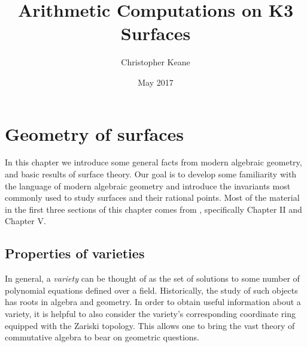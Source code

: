 \documentclass[12pt,twoside]{reedthesis}
\title{Arithmetic Computations on K3 Surfaces}
\author{Christopher Keane}
\date{May 2017}
\theoremstyle{plain}
\theoremstyle{definition}
\theoremstyle{remark}
\begin{document}
\tableofcontents
\mainmatter 
\pagestyle{fancyplain} 

\chapter{Geometry of surfaces}
In this chapter we introduce some general facts from modern algebraic geometry, and basic results of surface theory. Our goal is to develop some familiarity with the language of modern algebraic geometry and introduce the invariants most commonly used to study surfaces and their rational points. Most of the material in the first three sections of this chapter comes from \cite{hartshorne}, specifically Chapter II and Chapter V. 

\section{Properties of varieties}
In general, a \emph{variety} can be thought of as the set of solutions to some number of polynomial equations defined over a field. Historically, the study of such objects has roots in algebra and geometry. In order to obtain useful information about a variety, it is helpful to also consider the variety's corresponding coordinate ring equipped with the Zariski topology. This allows one to bring the vast theory of commutative algebra to bear on geometric questions. 
\end{document}
